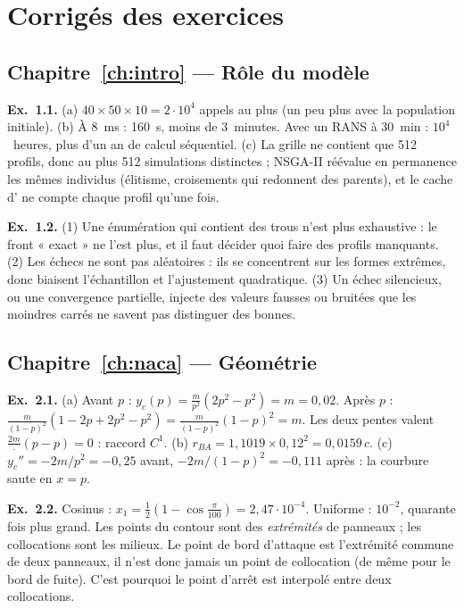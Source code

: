 \chapter{Corrigés des exercices}\label{annexe:corriges}

\section*{Chapitre~\ref{ch:intro} — Rôle du modèle}
\textbf{Ex.~1.1.} (a) $40\times50\times10=2\cdot10^4$ appels au plus (un peu plus avec la population initiale). (b) À 8~ms : 160~s, moins de 3~minutes. Avec un RANS à 30~min : $10^4$~heures, plus d'un an de calcul séquentiel. (c) La grille ne contient que 512 profils, donc au plus 512 simulations distinctes ; NSGA-II réévalue en permanence les mêmes individus (élitisme, croisements qui redonnent des parents), et le cache d' ne compte chaque profil qu'une fois.

\textbf{Ex.~1.2.} (1) Une énumération qui contient des trous n'est plus exhaustive : le front « exact » ne l'est plus, et il faut décider quoi faire des profils manquants. (2) Les échecs ne sont pas aléatoires : ils se concentrent sur les formes extrêmes, donc biaisent l'échantillon et l'ajustement quadratique. (3) Un échec silencieux, ou une convergence partielle, injecte des valeurs fausses ou bruitées que les moindres carrés ne savent pas distinguer des bonnes.

\section*{Chapitre~\ref{ch:naca} — Géométrie}
\textbf{Ex.~2.1.} (a) Avant $p$ : $y_c(p)=\frac{m}{p^2}(2p^2-p^2)=m=0{,}02$. Après $p$ : $\frac{m}{(1-p)^2}(1-2p+2p^2-p^2)=\frac{m}{(1-p)^2}(1-p)^2=m$. Les deux pentes valent $\frac{2m}{\cdot}(p-p)=0$ : raccord $C^1$. (b) $r_{BA}=1{,}1019\times0{,}12^2=0{,}0159\,c$. (c) $y_c''=-2m/p^2=-0{,}25$ avant, $-2m/(1-p)^2=-0{,}111$ après : la courbure saute en $x=p$.

\textbf{Ex.~2.2.} Cosinus : $x_1=\tfrac12(1-\cos\tfrac{\pi}{100})=2{,}47\cdot10^{-4}$. Uniforme : $10^{-2}$, quarante fois plus grand. Les points du contour sont des \emph{extrémités} de panneaux ; les collocations sont les milieux. Le point de bord d'attaque est l'extrémité commune de deux panneaux, il n'est donc jamais un point de collocation (de même pour le bord de fuite). C'est pourquoi le point d'arrêt est interpolé entre deux collocations.


